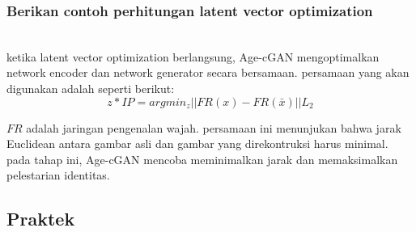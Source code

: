 \subsubsection{Berikan contoh perhitungan latent vector optimization}
\hfill\\
ketika latent vector optimization berlangsung, Age-cGAN mengoptimalkan network encoder dan network generator secara bersamaan. persamaan yang akan digunakan adalah seperti berikut:
\[z*IP = argmin_{z}||FR(x)- FR(\bar{x})||L_{2}\]

$FR$ adalah jaringan pengenalan wajah. persamaan ini menunjukan bahwa jarak Euclidean antara gambar asli dan gambar yang direkontruksi harus minimal. pada tahap ini, Age-cGAN mencoba meminimalkan jarak dan memaksimalkan pelestarian identitas.

\subsection{Praktek}
